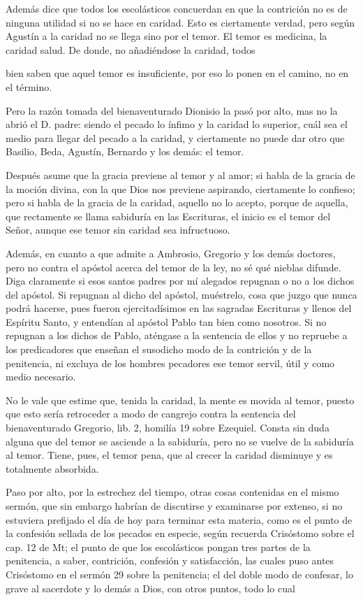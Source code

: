 Además dice que todos los escolásticos concuerdan en que la contrición no es de ninguna utilidad si no se hace en caridad. Esto es ciertamente verdad, pero según Agustín a la caridad no se llega sino por el temor. El temor es medicina, la caridad salud. De donde, no añadiéndose la caridad, todos

bien saben que aquel temor es insuficiente, por eso lo ponen en el camino, no en el término.

Pero la razón tomada del bienaventurado Dionisio la pasó por alto, mas no la abrió el D. padre: siendo el pecado lo ínfimo y la caridad lo superior, cuál sea el medio para llegar del pecado a la caridad, y ciertamente no puede dar otro que Basilio, Beda, Agustín, Bernardo y los demás: el temor.

Después asume que la gracia previene al temor y al amor; si habla de la gracia de la moción divina, con la que Dios nos previene aspirando, ciertamente lo confieso; pero si habla de la gracia de la caridad, aquello no lo acepto, porque de aquella, que rectamente se llama sabiduría en las Escrituras, el inicio es el temor del Señor, aunque ese temor sin caridad sea infructuoso.

Además, en cuanto a que admite a Ambrosio, Gregorio y los demás doctores, pero no contra el apóstol acerca del temor de la ley, no sé qué nieblas difunde. Diga claramente si esos santos padres por mí alegados repugnan o no a los dichos del apóstol. Si repugnan al dicho del apóstol, muéstrelo, cosa que juzgo que nunca podrá hacerse, pues fueron ejercitadísimos en las sagradas Escrituras y llenos del Espíritu Santo, y entendían al apóstol Pablo tan bien como nosotros. Si no repugnan a los dichos de Pablo, aténgase a la sentencia de ellos y no repruebe a los predicadores que enseñan el susodicho modo de la contrición y de la penitencia, ni excluya de los hombres pecadores ese temor servil, útil y como medio necesario.

No le vale que estime que, tenida la caridad, la mente es movida al temor, puesto que esto sería retroceder a modo de cangrejo contra la sentencia del bienaventurado Gregorio, lib. 2, homilía 19 sobre Ezequiel. Consta sin duda alguna que del temor se asciende a la sabiduría, pero no se vuelve de la sabiduría al temor. Tiene, pues, el temor pena, que al crecer la caridad disminuye y es totalmente absorbida.

\marginpar{\small[368]} Paso por alto, por la estrechez del tiempo, otras cosas contenidas en el mismo sermón, que sin embargo habrían de discutirse y examinarse por extenso, si no estuviera prefijado el día de hoy para terminar esta materia, como es el punto de la confesión sellada de los pecados en especie, según recuerda Crisóstomo sobre el cap. 12 de Mt; el punto de que los escolásticos pongan tres partes de la penitencia, a saber, contrición, confesión y satisfacción, las cuales puso antes Crisóstomo en el sermón 29 sobre la penitencia; el del doble modo de confesar, lo grave al sacerdote y lo demás a Dios, con otros puntos, todo lo cual

